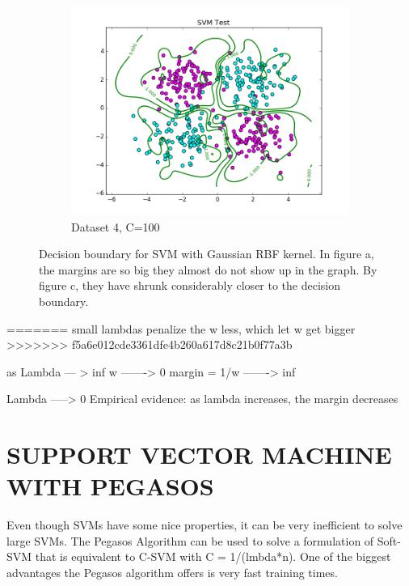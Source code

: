 \documentclass[10pt,twoside]{article}
\begin{document}
\begin{figure}[h]
\begin{subfigure}[b]{0.33\textwidth}
                \centering
                \includegraphics[width=\linewidth]{Figures/P2/RBF_data4_test_g1C100.png}
                \caption{Dataset 4, C=100}
        \end{subfigure}%
        \caption{Decision boundary for SVM with Gaussian RBF kernel. In figure a, the margins are so big they almost do not show up in the graph. By figure c, they have shrunk considerably closer to the decision boundary.}
\end{figure}

=======
small lambdas penalize the w less, which let w get bigger
>>>>>>> f5a6e012cde3361dfe4b260a617d8c21b0f77a3b

as Lambda --- > inf
   w -------> 0
   margin = 1/w -------> inf

   Lambda -----> 0
   Empirical evidence: as lambda increases, the margin decreases


\section{\uppercase{Support Vector Machine with Pegasos}}

Even though SVMs have some nice properties, it can be very inefficient to solve large SVMs. The Pegasos Algorithm can be used to solve a formulation of Soft-SVM that is equivalent to C-SVM with C = 1/(lmbda*n). One of the biggest advantages the Pegasos algorithm offers is very fast training times. 
\end{document}
